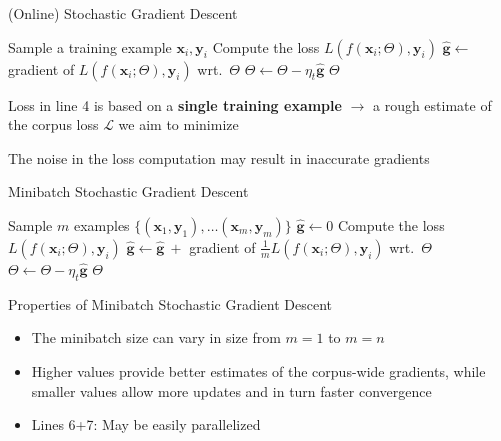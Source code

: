 \documentclass[12pt,aspectratio=169,handout]{beamer}
\begin{document}
\begin{frame}{(Online) Stochastic Gradient Descent}

\begin{algorithmic}[1]
		\State Sample a training example $\bm{x}_i, \bm{y}_i$
		\State Compute the loss $L(f(\bm{x}_i; \Theta), \bm{y}_i)$
		\State $\hat{\bm{g}} \gets$ gradient of $L(f(\bm{x}_i; \Theta), \bm{y}_i)$ wrt.\ $\Theta$
		\State $\Theta \gets \Theta - \eta_t \hat{\bm{g}}$
	\EndWhile
	\State \Return $\Theta$
	\EndFunction
\end{algorithmic}

Loss in line 4 is based on a \textbf{single training example} $\to$ a rough estimate of the corpus loss $\mathcal{L}$ we aim to minimize

The noise in the loss computation may result in inaccurate gradients

\end{frame}



\begin{frame}{Minibatch Stochastic Gradient Descent}
	
	\begin{algorithmic}[1]
		\State Sample $m$ examples $\{ (\bm{x}_1, \bm{y}_1), \ldots (\bm{x}_m, \bm{y}_m) \}$
		\State $\hat{\bm{g}} \gets 0$
			\State Compute the loss $L(f(\bm{x}_i; \Theta), \bm{y}_i)$
			\State $\hat{\bm{g}} \gets \hat{\bm{g}}\ + $ gradient of $\frac{1}{m} L(f(\bm{x}_i; \Theta), \bm{y}_i)$ wrt.\ $\Theta$
		\EndFor
		\State $\Theta \gets \Theta - \eta_t \hat{\bm{g}}$
		\EndWhile
		\State \Return $\Theta$
		\EndFunction
	\end{algorithmic}
	

\end{frame}

\begin{frame}{Properties of Minibatch Stochastic Gradient Descent}

\begin{itemize}
\item The minibatch size can vary in size from $m = 1$ to $m = n$
\item Higher values provide better estimates of the corpus-wide gradients, while smaller values allow more updates and in turn faster convergence
\item Lines 6+7: May be easily parallelized
\end{itemize}

\end{frame}
\end{document}
